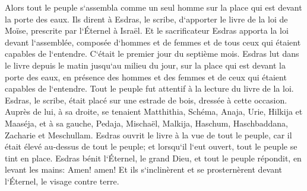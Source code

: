 \verse Alors tout le peuple s`assembla comme un seul homme sur la place qui est devant la porte des eaux. Ils dirent à Esdras, le scribe, d`apporter le livre de la loi de Moïse, prescrite par l`Éternel à Israël. 
\verse Et le sacrificateur Esdras apporta la loi devant l`assemblée, composée d`hommes et de femmes et de tous ceux qui étaient capables de l`entendre. C`était le premier jour du septième mois. 
\verse Esdras lut dans le livre depuis le matin jusqu`au milieu du jour, sur la place qui est devant la porte des eaux, en présence des hommes et des femmes et de ceux qui étaient capables de l`entendre. Tout le peuple fut attentif à la lecture du livre de la loi. 
\verse Esdras, le scribe, était placé sur une estrade de bois, dressée à cette occasion. Auprès de lui, à sa droite, se tenaient Matthithia, Schéma, Anaja, Urie, Hilkija et Maaséja, et à sa gauche, Pedaja, Mischaël, Malkija, Haschum, Haschbaddana, Zacharie et Meschullam. 
\verse Esdras ouvrit le livre à la vue de tout le peuple, car il était élevé au-dessus de tout le peuple; et lorsqu`il l`eut ouvert, tout le peuple se tint en place. 
\verse Esdras bénit l`Éternel, le grand Dieu, et tout le peuple répondit, en levant les mains: Amen! amen! Et ils s`inclinèrent et se prosternèrent devant l`Éternel, le visage contre terre. 
